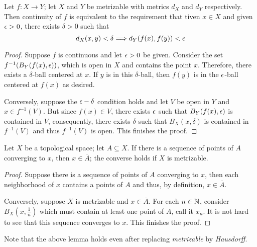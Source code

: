 \begin{theorem}
    Let $f:X\to Y$; let $X$ and $Y$ be metrizable with metrics $d_X$ and $d_Y$ respectively. Then continuity of $f$ is equivalent to the requirement that tiven $x\in X$ and given $\epsilon > 0$, there exists $\delta > 0$ such that 
    \begin{equation*}
        d_X(x,y) <\delta \Longrightarrow d_Y(f(x), f(y)) < \epsilon
    \end{equation*}
\end{theorem}
\begin{proof}
    Suppose $f$ is continuous and let $\epsilon > 0$ be given. Consider the set $f^{-1}(B_Y(f(x), \epsilon))$, which is open in $X$ and contains the point $x$. Therefore, there exists a $\delta$-ball centered at $x$. If $y$ is in this $\delta$-ball, then $f(y)$ is in the $\epsilon$-ball centered at $f(x)$ as desired.

    Conversely, suppose the $\epsilon-\delta$ condition holds and let $V$ be open in $Y$ and $x\in f^{-1}(V)$. But since $f(x)\in V$, there exists $\epsilon$ such that $B_Y(f(x),\epsilon)$ is contained in $V$, consequently, there exists $\delta$ such that $B_X(x, \delta)$ is contained in $f^{-1}(V)$ and thus $f^{-1}(V)$ is open. This finishes the proof.
\end{proof}

\begin{lemma}
    Let $X$ be a topological space; let $A\subseteq X$. If there is a sequence of points of $A$ converging to $x$, then $x\in\overline{A}$; the converse holds if $X$ is metrizable.
\end{lemma}
\begin{proof}
    Suppose there is a sequence of points of $A$ converging to $x$, then each neighborhood of $x$ contains a points of $A$ and thus, by definition, $x\in\overline{A}$.

    Conversely, suppose $X$ is metrizable and $x\in\overline{A}$. For each $n\in\mathbb{N}$, consider $B_X(x,\frac{1}{n})$ which must contain at least one point of $A$, call it $x_n$. It is not hard to see that this sequence converges to $x$. This finishes the proof.
\end{proof}

Note that the above lemma holds even after replacing \textit{metrizable} by \textit{Hausdorff}.

